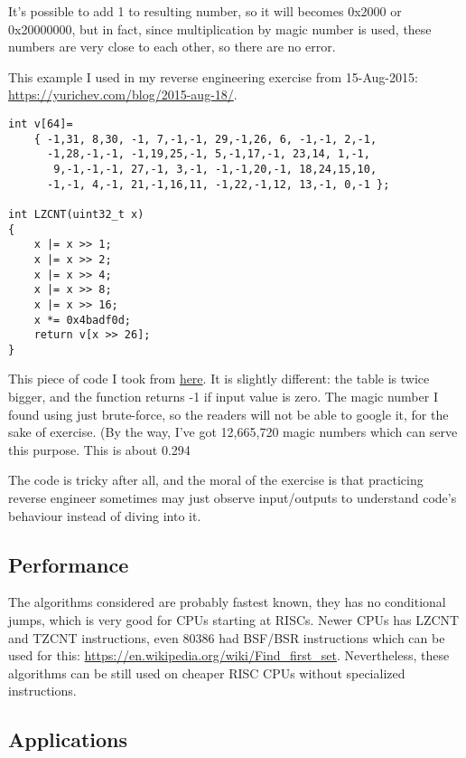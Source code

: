 It's possible to add 1 to resulting number, so it will becomes 0x2000 or 0x20000000, but in fact, since multiplication by magic number is used,
these numbers are very close to each other, so there are no error.

This example I used in my reverse engineering exercise from 15-Aug-2015: \url{https://yurichev.com/blog/2015-aug-18/}.

\begin{lstlisting}
int v[64]=
	{ -1,31, 8,30, -1, 7,-1,-1, 29,-1,26, 6, -1,-1, 2,-1,
	  -1,28,-1,-1, -1,19,25,-1, 5,-1,17,-1, 23,14, 1,-1,
	   9,-1,-1,-1, 27,-1, 3,-1, -1,-1,20,-1, 18,24,15,10,
	  -1,-1, 4,-1, 21,-1,16,11, -1,22,-1,12, 13,-1, 0,-1 };

int LZCNT(uint32_t x)
{
    x |= x >> 1;
    x |= x >> 2;
    x |= x >> 4;
    x |= x >> 8;
    x |= x >> 16;
    x *= 0x4badf0d;
    return v[x >> 26];
}
\end{lstlisting}

This piece of code I took from \href{http://stackoverflow.com/questions/7365562/de-bruijn-like-sequence-for-2n-1-how-is-it-constructed/7369288#7369288}{here}.
It is slightly different: the table is twice bigger, and the function returns -1 if input value is zero.
The magic number I found using just brute-force, so the readers will not be able to google it, for the sake of exercise.
(By the way, I've got 12,665,720 magic numbers which can serve this purpose.
This is about 0.294%

The code is tricky after all, and the moral of the exercise is that practicing reverse engineer sometimes may just observe input/outputs to understand
code's behaviour instead of diving into it.

\subsection{Performance}

The algorithms considered are probably fastest known, they has no conditional jumps, which is very good for CPUs starting at RISCs.
Newer CPUs has LZCNT and TZCNT instructions, even 80386 had BSF/BSR instructions which can be used for this: 
\url{https://en.wikipedia.org/wiki/Find_first_set}.
Nevertheless, these algorithms can be still used on cheaper RISC CPUs without specialized instructions.

\subsection{Applications}


